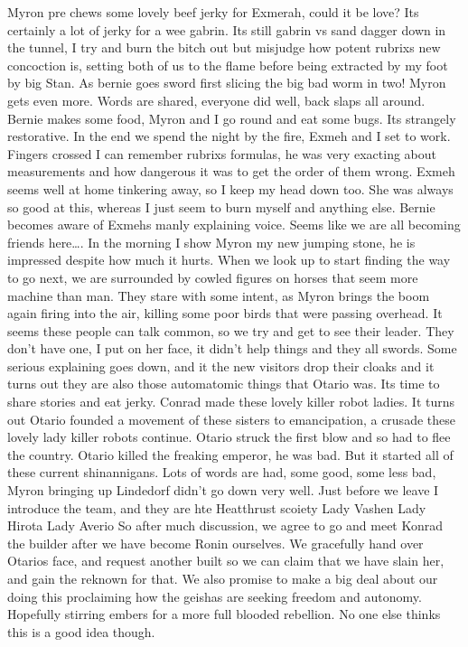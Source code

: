 Myron pre chews some lovely beef jerky for Exmerah, could it be love? Its certainly a lot of jerky for a wee gabrin.\medskip
Its still gabrin vs sand dagger down in the tunnel, I try and burn the bitch out but misjudge how potent rubrixs new concoction is, setting both of us to the flame before being extracted by my foot by big Stan. As bernie goes sword first slicing the big bad worm in two! Myron gets even more.\medskip
Words are shared, everyone did well, back slaps all around. Bernie makes some food, Myron and I go round and eat some bugs. Its strangely restorative. In the end we spend the night by the fire, Exmeh and I set to work. Fingers crossed I can remember rubrixs formulas, he was very exacting about measurements and how dangerous it was to get the order of them wrong. Exmeh seems well at home tinkering away, so I keep my head down too. She was always so good at this, whereas I just seem to burn myself and anything else. Bernie becomes aware of Exmehs manly explaining voice. Seems like we are all becoming friends here….\medskip
In the morning I show Myron my new jumping stone, he is impressed despite how much it hurts. When we look up to start finding the way to go next, we are surrounded by cowled figures on horses that seem more machine than man. They stare with some intent, as Myron brings the boom again firing into the air, killing some poor birds that were passing overhead. It seems these people can talk common, so we try and get to see their leader. They don’t have one, I put on her face, it didn’t help things and they all swords.\medskip
Some serious explaining goes down, and it the new visitors drop their cloaks and it turns out they are also those automatomic things that Otario was. Its time to share stories and eat jerky. Conrad made these lovely killer robot ladies.\medskip
It turns out Otario founded a movement of these sisters to emancipation, a crusade these lovely lady killer robots continue. Otario struck the first blow and so had to flee the country. Otario killed the freaking emperor, he was bad. But it started all of these current shinannigans.\medskip
Lots of words are had, some good, some less bad, Myron bringing up Lindedorf didn’t go down very well. Just before we leave I introduce the team, and they are hte Heatthrust scoiety\medskip
Lady Vashen\medskip
Lady Hirota\medskip
Lady Averio\medskip
So after much discussion, we agree to go and meet Konrad the builder after we have become Ronin ourselves. We gracefully hand over Otarios face, and request another built so we can claim that we have slain her, and gain the reknown for that. We also promise to make a big deal about our doing this proclaiming how the geishas are seeking freedom and autonomy. Hopefully stirring embers for a more full blooded rebellion. No one else thinks this is a good idea though.\medskip
